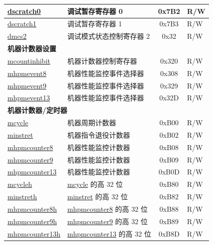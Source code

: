 \begin{longtable}{ | p{4.0cm} | p{8.4cm} | c | l | }
\hyperref[regdesc:DSCRATCH0]{dscratch0} & 调试暂存寄存器 0 & 0x7B2 & R/W \\\hline
\hyperref[regdesc:DSCRATCH1]{dscratch1} & 调试暂存寄存器 1 & 0x7B3 & R/W \\\hline
\hyperref[regdesc:dmcs2]{dmcs2} & 调试模式状态控制寄存器 2 & 0x32 & R/W \\\hline
\multicolumn{4}{|l|}{\textbf{机器计数器设置}} \\\hline
\hyperref[regdesc:MCOUNTINHIBIT]{mcountinhibit} & 机器计数器控制寄存器 & 0x320 & R/W \\\hline
\hyperref[regdesc:MHPMEVENT8]{mhpmevent8} & 机器性能监控事件选择器 & 0x308 & R/W \\\hline
\hyperref[regdesc:MHPMEVENT9]{mhpmevent9} & 机器性能监控事件选择器 & 0x329& R/W \\\hline
\hyperref[regdesc:MHPMEVENT13]{mhpmevent13} & 机器性能监控事件选择器 & 0x32D & R/W \\\hline


\multicolumn{4}{|l|}{\textbf{机器计数器/定时器}} \\\hline
\hyperref[regdesc:MCYCLE]{mcycle} & 机器周期计数器 & 0xB00 & R/W \\\hline
\hyperref[regdesc:MINSTRET]{minstret} & 机器指令退役计数器 & 0xB02 & R/W \\\hline
\hyperref[regdesc:MHPMCOUNTER8]{mhpmcounter8} & 机器性能监控计数器 & 0xB08 & R/W \\\hline
\hyperref[regdesc:MHPMCOUNTER9]{mhpmcounter9} & 机器性能监控计数器 & 0xB09 & R/W \\\hline
\hyperref[regdesc:MHPMCOUNTER13]{mhpmcounter13} & 机器性能监控计数器 & 0xB0D & R/W \\\hline
\hyperref[regdesc:MCYCLEH]{mcycleh} & \hyperref[regdesc:MCYCLE]{mcycle} 的高 32 位 & 0xB80 & R/W \\\hline
\hyperref[regdesc:MINSTRETH]{minstreth} & \hyperref[regdesc:MINSTRET]{minstret} 的高 32 位 & 0xB82 & R/W \\\hline
\hyperref[regdesc:MHPMCOUNTER8H]{mhpmcounter8h} & \hyperref[regdesc:MHPMCOUNTER8]{mhpmcounter8} 的高 32 位 & 0xB88 & R/W \\\hline
\hyperref[regdesc:MHPMCOUNTER9H]{mhpmcounter9h} & \hyperref[regdesc:MHPMCOUNTER9]{mhpmcounter9} 的高 32 位 & 0xB89 & R/W \\\hline
\hyperref[regdesc:MHPMCOUNTER13H]{mhpmcounter13h} & \hyperref[regdesc:MHPMCOUNTER13]{mhpmcounter13} 的高 32 位 & 0xB8D & R/W \\\hline


\end{longtable}
